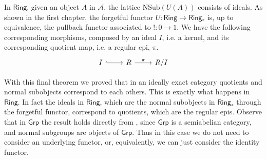 \begin{rembox}{}
    \begin{rem}
        In $\mathsf{Ring}$, given an object $A$ in $\mathcal{A}$, the lattice $\mathrm{NSub}(U(A))$ consists of ideals. As shown in the first chapter, the forgetful functor $U:\mathsf{Ring} \to \mathsf{Ring_*}$ is, up to equivalence, the pullback functor associated to $! : 0 \to 1$. We have the following corresponding morphisms, composed by an ideal $I$, i.e. a kernel, and its corresponding quotient map, i.e. a regular epi, $\pi$.
        \[
\begin{tikzcd}
I \arrow[r, hook] & R \arrow[r, "\pi"] & R/I
\end{tikzcd}
        \]
    \end{rem}
\end{rembox}

With this final theorem we proved that in an ideally exact category quotients and normal subobjects correspond to each others. This is exactly what happens in $\mathsf{Ring}$. In fact the ideals in $\mathsf{Ring}$, which are the normal subobjects in $\mathsf{Ring_*}$ through the forgetful functor, correspond to quotients, which are the regular epis. Observe that in $\mathsf{Grp}$ the result holds directly from , since $\mathsf{Grp}$ is a semiabelian category, and normal subgroups are objects of $\mathsf{Grp}$. Thus in this case we do not need to consider an underlying functor, or, equivalently, we can just consider the identity functor.